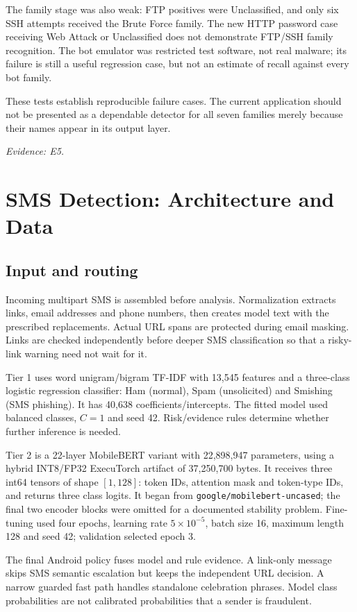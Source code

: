 \documentclass[11pt,a4paper]{article}
\newcommand{\source}[1]{{\small\textit{Evidence: #1.}\par}}
\newcommand{\chapterpage}[1]{\clearpage\section{#1}}
\begin{document}
The family stage was also weak: FTP positives were Unclassified, and only six SSH
attempts received the Brute Force family. The new HTTP password case receiving Web Attack
or Unclassified does not demonstrate FTP/SSH family recognition. The bot emulator was
restricted test software, not real malware; its failure is still a useful regression
case, but not an estimate of recall against every bot family.

These tests establish reproducible failure cases. The current application should not
be presented as a dependable detector for all seven families merely because their
names appear in its output layer.
\source{E5}

\chapterpage{SMS Detection: Architecture and Data}
\subsection*{Input and routing}
Incoming multipart SMS is assembled before analysis. Normalization extracts links,
email addresses and phone numbers, then creates model text with the prescribed replacements.
Actual URL spans are protected during email masking. Links are checked independently
before deeper SMS classification so that a risky-link warning need not wait for it.

Tier 1 uses word unigram/bigram TF-IDF with 13,545 features and a three-class logistic
regression classifier: Ham (normal), Spam (unsolicited) and Smishing (SMS phishing).
It has 40,638 coefficients/intercepts. The fitted model used balanced classes,
$C=1$ and seed 42. Risk/evidence rules determine whether further inference is needed.

Tier 2 is a 22-layer MobileBERT variant with 22,898,947 parameters, using a hybrid
INT8/FP32 ExecuTorch artifact of 37,250,700 bytes. It receives three int64 tensors
of shape $[1,128]$: token IDs, attention mask and token-type IDs, and returns three
class logits. It began from \texttt{google/mobilebert-uncased}; the final two encoder
blocks were omitted for a documented stability problem. Fine-tuning used four epochs,
learning rate $5\times10^{-5}$, batch size 16, maximum length 128 and seed 42;
validation selected epoch 3.

The final Android policy fuses model and rule evidence. A link-only message skips SMS
semantic escalation but keeps the independent URL decision. A narrow guarded fast path
handles standalone celebration phrases. Model class probabilities are not calibrated
probabilities that a sender is fraudulent.
\end{document}
